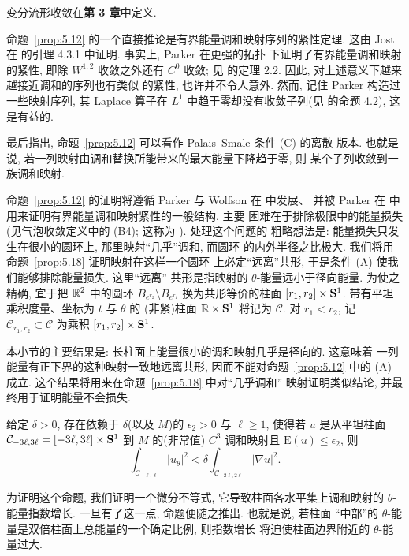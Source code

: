 变分流形收敛在\textbf{第 3 章}中定义.

命题~\ref{prop:5.12} 的一个直接推论是有界能量调和映射序列的紧性定理.
这由 Jost 在 \cite{Jo} 的引理 4.3.1 中证明. 事实上, Parker 在更强的拓扑
下证明了有界能量调和映射的紧性, 即除 $W^{1,2}$ 收敛之外还有 $C^0$ 收敛;
见 \cite{Pk} 的定理 2.2. 因此, 对上述意义下越来越接近调和的序列也有类似
的紧性, 也许并不令人意外. 然而, 记住 Parker 构造过一些映射序列, 其
Laplace 算子在 $L^1$ 中趋于零却没有收敛子列(见 \cite{Pk} 的命题 4.2),
这是有益的.

最后指出, 命题~\ref{prop:5.12} 可以看作 Palais--Smale 条件 (C) 的离散
版本. 也就是说, 若一列映射由调和替换所能带来的最大能量下降趋于零, 则
某个子列收敛到一族调和映射.

命题~\ref{prop:5.12} 的证明将遵循 Parker 与 Wolfson 在 \cite{PkW} 中发展、
并被 Parker 在 \cite{Pk} 中用来证明有界能量调和映射紧性的一般结构. 主要
困难在于排除极限中的能量损失(见气泡收敛定义中的 (B4); 这称为
). 处理这个问题的
粗略想法是: 能量损失只发生在很小的圆环上, 那里映射``几乎''调和, 而圆环
的内外半径之比极大. 我们将用命题~\ref{prop:5.18} 证明映射在这样一个圆环
上必定``远离''共形, 于是条件 (A) 使我们能够排除能量损失. 这里``远离''
共形是指映射的 $\theta$-能量远小于径向能量. 为使之精确, 宜于把 $\mathbb{R}^2$
中的圆环 $B_{e^{r_2}}\setminus B_{e^{r_1}}$ 换为共形等价的柱面
$[r_1,r_2]\times\mathbf{S}^1$. 带有平坦乘积度量、坐标为 $t$ 与 $\theta$ 的
(非紧)柱面 $\mathbb{R}\times\mathbf{S}^1$ 将记为 $\mathcal{C}$. 对 $r_1<r_2$, 记
$\mathcal{C}_{r_1,r_2}\subset\mathcal{C}$ 为乘积
$[r_1,r_2]\times\mathbf{S}^1$.

本小节的主要结果是: 长柱面上能量很小的调和映射几乎是径向的. 这意味着
一列能量有正下界的这种映射一致地远离共形, 因而不能对命题~\ref{prop:5.12}
中的 (A) 成立. 这个结果将用来在命题~\ref{prop:5.18} 中对``几乎调和''
映射证明类似结论, 并最终用于证明能量不会损失.

\begin{proposition}
\label{prop:5.13}
给定 $\delta>0$, 存在依赖于 $\delta$(以及 $M$)的 $\epsilon_2>0$ 与
$\ell\geq 1$, 使得若 $u$ 是从平坦柱面
$\mathcal{C}_{-3\ell,3\ell}=[-3\ell,3\ell]\times\mathbf{S}^1$ 到 $M$ 的(非常值)
$C^3$ 调和映射且 $\mathrm{E}(u)\leq\epsilon_2$, 则
\begin{equation}
\int_{\mathcal{C}_{-\ell,\ell}}|u_\theta|^2
<\delta\int_{\mathcal{C}_{-2\ell,2\ell}}|\nabla u|^2.
\label{eq:5.39}
\end{equation}
\end{proposition}

为证明这个命题, 我们证明一个微分不等式, 它导致柱面各水平集上调和映射的
$\theta$-能量指数增长. 一旦有了这一点, 命题便随之推出. 也就是说, 若柱面
``中部''的 $\theta$-能量是双倍柱面上总能量的一个确定比例, 则指数增长
将迫使柱面边界附近的 $\theta$-能量过大.

